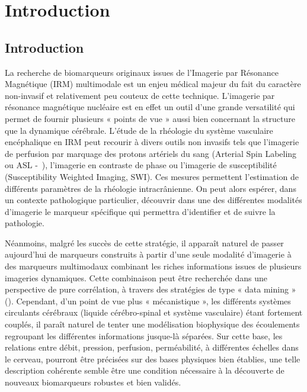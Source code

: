 \chapter{Introduction}
	
\minitoc
	





\section{Introduction}
		
		La recherche de biomarqueurs originaux issues de l’Imagerie par Résonance Magnétique (IRM) multimodale est un enjeu médical majeur du fait du caractère non-invasif et relativement peu 
couteux de cette technique. L'imagerie par résonance magnétique nucléaire est en effet un outil d'une grande versatilité qui permet de fournir plusieurs « points de vue » aussi bien concernant 
la structure que la dynamique cérébrale. L’étude de la rhéologie du système vasculaire encéphalique en IRM peut recourir à divers outils non invasifs tels que l’imagerie de perfusion par marquage 
des protons artériels du sang (Arterial Spin Labeling ou ASL -~\cite{Alsop2014}), l’imagerie en contraste de phase ou l’imagerie de susceptibilité (Susceptibility Weighted Imaging, SWI). Ces mesures permettent 
l’estimation de différents paramètres de la rhéologie intracrânienne. On peut alors espérer, dans un contexte pathologique particulier, découvrir dans une des différentes modalités d'imagerie le 
marqueur spécifique qui permettra d'identifier et de suivre la pathologie.

Néanmoins, malgré les succès de cette stratégie, il apparaît naturel de passer aujourd'hui de marqueurs construits à partir d'une seule modalité d'imagerie à des marqueurs multimodaux combinant 
les riches informations issues de plusieurs imageries dynamiques. Cette combinaison peut être recherchée dans une perspective de pure corrélation, à travers des stratégies de type « data mining » (\cite{Lin2012}). 
Cependant, d'un point de vue plus « mécanistique », les différents systèmes circulants cérébraux (liquide cérébro-spinal et système vasculaire) étant fortement couplés, il paraît naturel de tenter une 
modélisation biophysique des écoulements regroupant les différentes informations jusque-là séparées. Sur cette base, les relations entre débit, pression, perfusion, perméabilité, à différentes échelles 
dans le cerveau, pourront être précisées sur des bases physiques bien établies, une telle description cohérente semble être une condition nécessaire à la découverte de nouveaux biomarqueurs robustes et 
bien validés.

